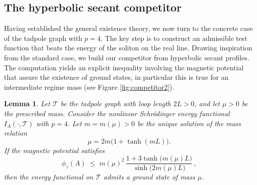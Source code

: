 \documentclass[12pt,a4paper]{amsart}
\theoremstyle{definition}
\theoremstyle{plain}
\newtheorem{lemma}[definition]{Lemma}
\numberwithin{equation}{section}
\begin{document}
\subsection{The hyperbolic secant competitor}
\label{Sec6.1}

Having established the general existence theory, we now turn to the concrete case of the tadpole graph with $p=4$. The key step is to construct an admissible test function that beats the energy of the soliton on the real line. Drawing inspiration from the standard case, we build our competitor from hyperbolic secant profiles.  The computation yields an explicit inequality involving the magnetic potential that assure the existence of ground states, in particular this is true for an intermediate regime mass (see Figure \ref{fig:competitor2}). 


\begin{lemma}
Let $\mathcal{T}$ be the tadpole graph with loop length $2L>0$, and let $\mu>0$ be the prescribed mass. Consider the nonlinear Schr\"odinger energy functional $I_A(\cdot,\mathcal{T})$  with $p=4$.
Let $m=m(\mu)>0$ be the unique solution of the mass relation
\begin{equation}
\mu = 2m\big(1+\tanh(mL)\big).
\end{equation}
If the magnetic potential satisfies
\begin{equation}
    \label{magneticexistence}
    \phi_{\gamma}(A) \;\leq\; m(\mu)^2\,\frac{1 + 3\tanh\!\big(m(\mu)L\big)}{\sinh\!\big(2m(\mu)L\big)}\,,
\end{equation}
then the energy functional on $\mathcal{T}$ admits a ground state of mass $\mu$.
\end{lemma}
\end{document}
